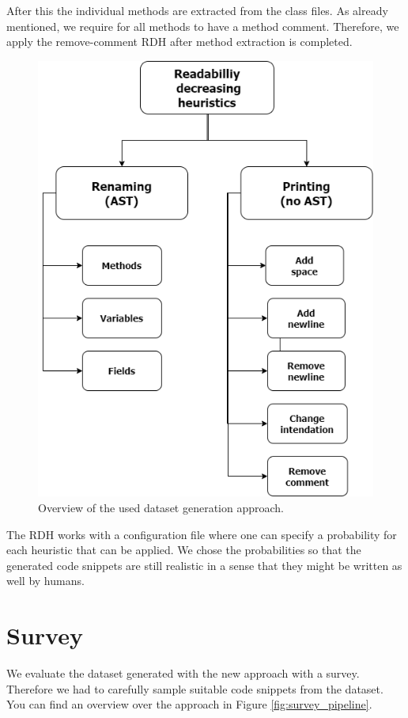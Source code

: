 \documentclass[%
class=scrreprt,
chapterprefix=false,%
open=right,%
twoside=false,%
paper=a4,%
logofile={Logo\_zentral\_farbig\_EN.png},%
thesistype=master,%
UKenglish,%
]{se2thesis}
\begin{document}
	After this the individual methods are extracted from the class files. As already mentioned, we require for all methods to have a method comment. Therefore, we apply the remove-comment RDH after method extraction is completed.
	
	\begin{figure}[t]
		\centering
		\includegraphics[width=\textwidth]{img/rdh.png}
		\caption{Overview of the used dataset generation approach.}
		\label{fig:rdh}
	\end{figure}
	
	The RDH works with a configuration file where one can specify a probability for each heuristic that can be applied. We chose the probabilities so that the generated code snippets are still realistic in a sense that they might be written as well by humans.
	
\section{Survey} \label{Survey}
	We evaluate the dataset generated with the new approach with a survey. Therefore we had to carefully sample suitable code snippets from the dataset. You can find an overview over the approach in Figure \ref{fig:survey_pipeline}.
	
\end{document}
